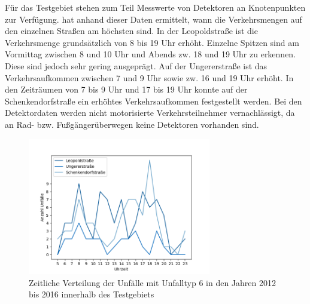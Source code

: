 Für das Testgebiet stehen zum Teil Messwerte von Detektoren an Knotenpunkten zur Verfügung. \Textcite[S.10-16]{Bruhn.2018} hat anhand dieser Daten ermittelt, wann die Verkehrsmengen auf den einzelnen Straßen am höchsten sind. In der Leopoldstraße ist die Verkehrsmenge grundsätzlich von 8 bis 19 Uhr erhöht. Einzelne Spitzen sind am Vormittag zwischen 8 und 10 Uhr und Abends zw. 18 und 19 Uhr zu erkennen. Diese sind jedoch sehr gering ausgeprägt. Auf der Ungererstraße ist das Verkehrsaufkommen zwischen 7 und 9 Uhr sowie zw. 16 und 19 Uhr erhöht. In den Zeiträumen von 7 bis 9 Uhr und 17 bis 19 Uhr konnte auf der Schenkendorfstraße ein erhöhtes Verkehrsaufkommen festgestellt werden. Bei den Detektordaten werden nicht motorisierte Verkehrsteilnehmer vernachlässigt, da an Rad- bzw. Fußgängerüberwegen keine Detektoren vorhanden sind.

\begin{savenotes}
	\begin{figure}[H]
		\centering
		\includegraphics[width=8cm,height=6cm]{figures/Typ6}
		\caption[Zeitliche Verteilung der Unfälle mit Unfalltyp 6 in den Jahren 2012 bis 2016 innerhalb des Testgebiets]{Zeitliche Verteilung der Unfälle mit Unfalltyp 6 in den Jahren 2012 bis 2016 innerhalb des Testgebiets}\label{fig:Unfalltyp6_Uhrzeit}
	\end{figure}
\end{savenotes}

